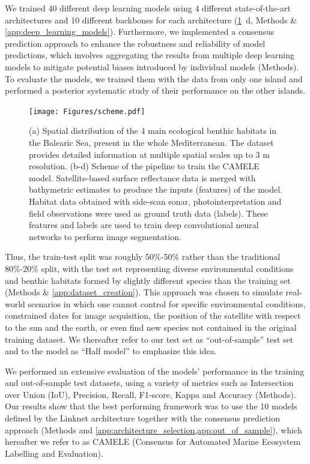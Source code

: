 We trained 40 different deep learning models using 4
different state-of-the-art architectures and 10 different backbones for each
architecture (\cref{fig:scheme}~\textcolor{ref_color}{d}, Methods \&
\cref{app:deep_learning_models}).
Furthermore, we implemented a consensus prediction approach to enhance the
robustness and reliability of model predictions, which involves aggregating the
results from multiple deep learning models to mitigate potential biases
introduced by individual models (Methods). To evaluate the models, we trained
them with the data from only one island  and performed a posterior systematic
study of their performance on the other islands.

\begin{figure}[H]
    \centering
    \texttt{[image: Figures/scheme.pdf]}
    \caption[AI framework for seagrass monitoring from satellite imagery]{(a)
        Spatial distribution of the 4 main ecological benthic habitats
        in the Balearic Sea, present in the whole Mediterranean. The dataset
        provides detailed information at multiple spatial scales up to 3 m
        resolution. (b-d) Scheme of the pipeline to train the CAMELE model.
        Satellite-based surface reflectance data is merged with bathymetric
        estimates to produce the inputs (features) of the model. Habitat data
        obtained with side-scan sonar, photointerpretation and field
        observations were used as ground truth data (labels). These features
        and labels are used to train deep convolutional neural networks to
        perform image segmentation.}
    \label{fig:scheme}
\end{figure}

Thus, the train-test split was roughly 50\%-50\% rather than the traditional
80\%-20\% split, with the test set representing diverse environmental
conditions and benthic habitats formed by slightly different species than
the training set (Methods \& \cref{app:dataset_creation}). This approach
was chosen to simulate real-world scenarios in which one cannot control for
specific environmental conditions, constrained dates for image acquisition, the
position of the satellite with respect to the sun and the earth, or even find
new species not contained in the original training dataset. We thereafter refer
to our test set as ``out-of-sample'' test set and to the model as ``Half
model'' to emphasize this idea.

We performed an extensive evaluation of the models' performance in the
training and out-of-sample test datasets, using a variety of metrics such as
Intersection over Union (IoU), Precision, Recall, F1-score, Kappa and Accuracy
(Methods). Our results show that the best performing framework was to use the
10 models defined by the Linknet architecture together with the consensus
prediction approach (Methods and
\cref{app:architecture_selection,app:out_of_sample}), which hereafter we
refer to as CAMELE (Consensus for Automated Marine Ecosystem Labelling and
Evaluation).

